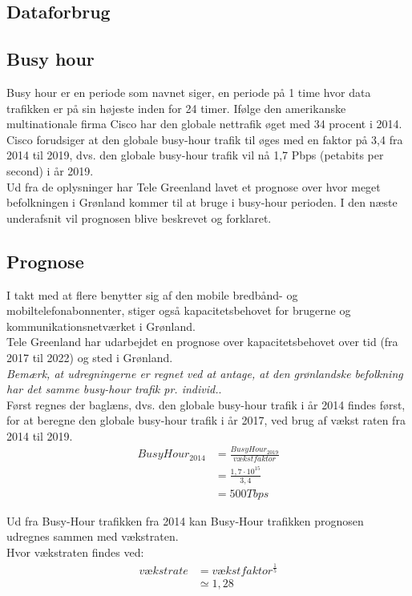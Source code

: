\subsection{Dataforbrug}

\subsection{Busy hour}
Busy hour er en periode som navnet siger, en periode på 1 time hvor data trafikken er på sin højeste inden for 24 timer. Ifølge den amerikanske multinationale firma Cisco har den globale nettrafik øget med 34 procent i 2014. Cisco forudsiger at den globale busy-hour trafik til øges med en faktor på 3,4 fra 2014 til 2019, dvs. den globale busy-hour trafik vil nå 1,7 Pbps (petabits per second) i år 2019\cite{busy-hour}.\\
Ud fra de oplysninger har Tele Greenland lavet et prognose over hvor meget befolkningen i Grønland kommer til at bruge i busy-hour perioden. I den næste underafsnit vil prognosen blive beskrevet og forklaret.

\subsection{Prognose}\label{sec:prognose}
I takt med at flere benytter sig af den mobile bredbånd- og mobiltelefonabonnenter, stiger også kapacitetsbehovet for brugerne og kommunikationsnetværket i Grønland.\\
Tele Greenland har udarbejdet en prognose over kapacitetsbehovet over tid (fra 2017 til 2022) og sted i Grønland.\\
\textit{Bemærk, at udregningerne er regnet ved at antage, at den grønlandske befolkning har det samme busy-hour trafik pr. individ.}.\\
Først regnes der baglæns, dvs. den globale busy-hour trafik i år 2014 findes først, for at beregne den globale busy-hour trafik i år 2017, ved brug af vækst raten fra 2014 til 2019.\\

\begin{align}
	Busy Hour_{2014}& = \frac{Busy Hour_{2019}}{vækstfaktor} \nonumber\\
	&= \frac{1,7 \cdot 10^{15}}{3,4} \nonumber\\
	&= 500 Tbps
\end{align}

Ud fra Busy-Hour trafikken fra 2014 kan Busy-Hour trafikken prognosen udregnes sammen med vækstraten.\\ Hvor vækstraten findes ved:
\begin{align}
	vækstrate &= vækstfaktor^\frac{1}{5} \nonumber\\
	&\simeq 1,28
\end{align}

